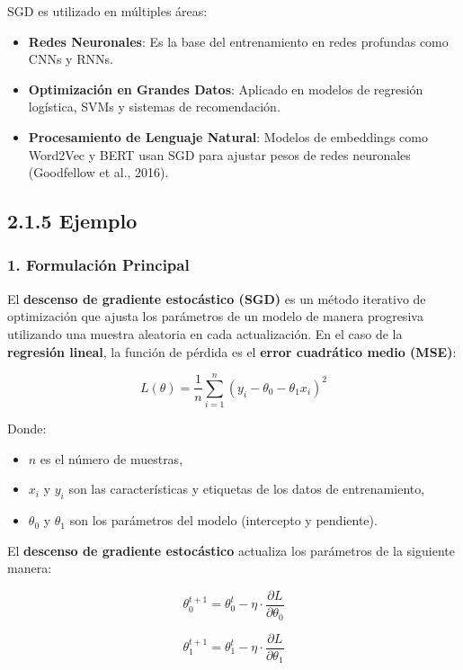 \documentclass[a5paper]{article}
\begin{document}
	SGD es utilizado en m\'ultiples \'areas:
	
	\begin{itemize}
		\item \textbf{Redes Neuronales}: Es la base del entrenamiento en redes profundas como CNNs y RNNs.
		\item \textbf{Optimizaci\'on en Grandes Datos}: Aplicado en modelos de regresi\'on log\'istica, SVMs y sistemas de recomendaci\'on.
		\item \textbf{Procesamiento de Lenguaje Natural}: Modelos de embeddings como Word2Vec y BERT usan SGD para ajustar pesos de redes neuronales (Goodfellow et al., 2016).
	\end{itemize}
	
	
	\subsection*{2.1.5 Ejemplo}
	
	\subsubsection*{1. Formulación Principal}
	
	El \textbf{descenso de gradiente estocástico (SGD)} es un método iterativo de optimización que ajusta los parámetros de un modelo de manera progresiva utilizando una muestra aleatoria en cada actualización. En el caso de la \textbf{regresión lineal}, la función de pérdida es el \textbf{error cuadrático medio (MSE)}:
	
	\[
	L(\theta) = \frac{1}{n} \sum_{i=1}^{n} (y_i - \theta_0 - \theta_1 x_i)^2
	\]
	
	Donde:  
	\begin{itemize}
		\item \( n \) es el número de muestras,  
		\item \( x_i \) y \( y_i \) son las características y etiquetas de los datos de entrenamiento,  
		\item \( \theta_0 \) y \( \theta_1 \) son los parámetros del modelo (intercepto y pendiente).  
	\end{itemize}
	
	El \textbf{descenso de gradiente estocástico} actualiza los parámetros de la siguiente manera:
	
	\[
	\theta_0^{t+1} = \theta_0^t - \eta \cdot \frac{\partial L}{\partial \theta_0}
	\]
	
	\[
	\theta_1^{t+1} = \theta_1^t - \eta \cdot \frac{\partial L}{\partial \theta_1}
	\]
	
\end{document}
